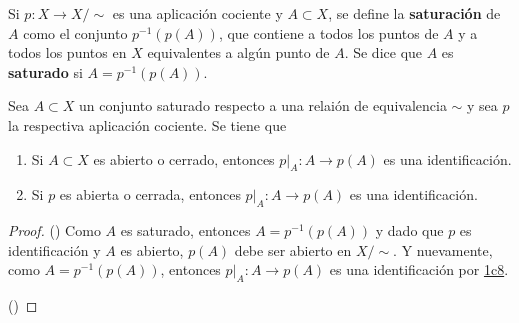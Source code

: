

\begin{definition}
Si $p : X \longrightarrow X/\sim$ es una aplicación cociente y $A \subset X$, se define la \textbf{saturación} de $A$ como el conjunto $p^{-1}(p(A))$, que contiene a todos los puntos de $A$ y a todos los puntos en $X$ equivalentes a algún punto de $A$. Se dice que $A$ es \textbf{saturado} si $A = p^{-1}(p(A))$.
\end{definition}

\begin{proposition}
Sea $A \subset X$ un conjunto saturado respecto a una relaión de equivalencia $\sim$ y sea $p$ la respectiva aplicación cociente. Se tiene que
\begin{enumerate}[label=\textnormal{(\roman*)}]
\item Si $A \subset X$ es abierto o cerrado, entonces $p|_A : A \longrightarrow p(A)$ es una identificación.
\item Si $p$ es abierta o cerrada, entonces $p|_A : A \longrightarrow p(A)$ es una identificación.
\end{enumerate}
\end{proposition}

\begin{proof}
({\scshape{}}) Como $A$ es saturado, entonces $A = p^{-1}(p(A))$ y dado que $p$ es identificación y $A$ es abierto, $p(A)$ debe ser abierto en $X/\sim$. Y nuevamente, como $A = p^{-1}(p(A))$, entonces $p|_A : A \longrightarrow p(A)$ es una identificación por \hyperref[card:1c8]{\textsf{1c8}}.
\bigskip

({\scshape{}})
\end{proof}
